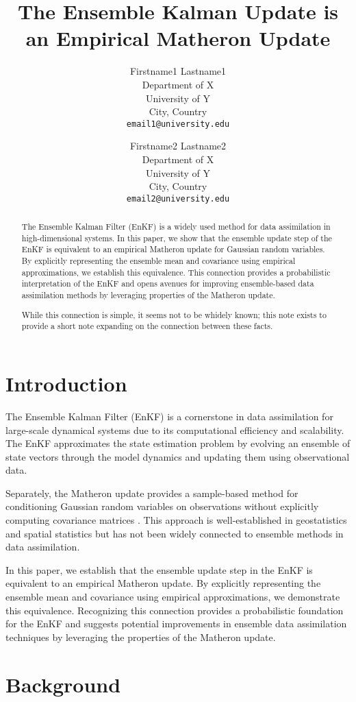 \documentclass{article}
\title{The Ensemble Kalman Update is an Empirical Matheron Update}
\author{
  Firstname1 Lastname1 \\
  Department of X \\
  University of Y \\
  City, Country \\
  \texttt{email1@university.edu} \\
  \and
  Firstname2 Lastname2 \\
  Department of X \\
  University of Y \\
  City, Country \\
  \texttt{email2@university.edu} \\
}
\date{}
\begin{document}
\begin{abstract}
The Ensemble Kalman Filter (EnKF) is a widely used method for data assimilation in high-dimensional systems. In this paper, we show that the ensemble update step of the EnKF is equivalent to an empirical Matheron update for Gaussian random variables. By explicitly representing the ensemble mean and covariance using empirical approximations, we establish this equivalence. This connection provides a probabilistic interpretation of the EnKF and opens avenues for improving ensemble-based data assimilation methods by leveraging properties of the Matheron update.

While this connection is simple, it seems not to be whidely known; this note exists to provide a short note expanding on the connection between these facts.
\end{abstract}

\section{Introduction}
The Ensemble Kalman Filter (EnKF) \citep{Evensen2003Ensemble,Evensen2009Data} is a cornerstone in data assimilation for large-scale dynamical systems due to its computational efficiency and scalability.
The EnKF approximates the state estimation problem by evolving an ensemble of state vectors through the model dynamics and updating them using observational data.

Separately, the Matheron update provides a sample-based method for conditioning Gaussian random variables on observations without explicitly computing covariance matrices \citep{Doucet2010Note,Wilson2020Efficiently,Wilson2021Pathwise}.
This approach is well-established in geostatistics and spatial statistics but has not been widely connected to ensemble methods in data assimilation.

In this paper, we establish that the ensemble update step in the EnKF is equivalent to an empirical Matheron update.
By explicitly representing the ensemble mean and covariance using empirical approximations, we demonstrate this equivalence.
Recognizing this connection provides a probabilistic foundation for the EnKF and suggests potential improvements in ensemble data assimilation techniques by leveraging the properties of the Matheron update.

\section{Background}
\end{document}
